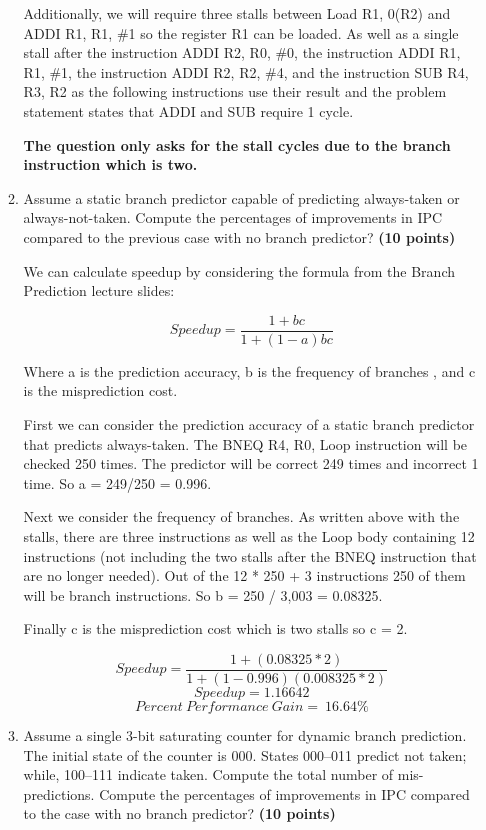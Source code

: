 \documentclass[a4paper, 11pt]{exam}
\begin{document}
\begin{enumerate}
\begin{enumerate}
Additionally, we will require three stalls between Load R1, 0(R2) and ADDI R1, R1, \#1 so the register R1 can be loaded. As well as a single stall after the instruction ADDI R2, R0, \#0, the instruction ADDI R1, R1, \#1, the instruction ADDI R2, R2, \#4, and the instruction SUB R4, R3, R2 as the following instructions use their result and the problem statement states that ADDI and SUB require 1 cycle.

\textbf{The question only asks for the stall cycles due to the branch instruction which is two.}

    \item  Assume a static branch predictor capable of predicting always-taken or always-not-taken. Compute the percentages of improvements in IPC compared to the previous case with no branch predictor? \textbf {(10 points)}
    
 \hfill
 
We can calculate speedup by considering the formula from the Branch Prediction lecture slides:

$$Speedup = \frac{1 + bc}{1 + (1 -a)bc}$$

Where a is the prediction accuracy, b is the frequency of branches , and c is the misprediction cost.

First we can consider the prediction accuracy of a static branch predictor that predicts always-taken. The BNEQ R4, R0, Loop instruction will be checked 250 times. The predictor will be correct 249 times and incorrect 1 time. So a = 249/250 = 0.996.

Next we consider the frequency of branches. As written above with the stalls, there are three instructions as well as the Loop body containing 12 instructions (not including the two stalls after the BNEQ instruction that are no longer needed). Out of the 12 * 250 + 3 instructions 250 of them will be branch instructions. So b = 250 / 3,003 = 0.08325.

Finally c is the misprediction cost which is two stalls so c = 2.

$$Speedup = \frac{1 + (0.08325 * 2)}{1 + (1 - 0.996)(0.008325 * 2)}$$
$$Speedup = 1.16642$$
$$Percent \ Performance \ Gain = ~16.64\%$$

\hfill

   \item Assume a single 3-bit saturating counter for dynamic branch prediction. The initial state of the counter is 000. States 000--011 predict not taken; while, 100--111 indicate taken. Compute the total number of mis-predictions. Compute the percentages of improvements in IPC compared to the case with no branch predictor? \textbf {(10 points)}
   

\end{enumerate}
\end{enumerate}
\end{document}
